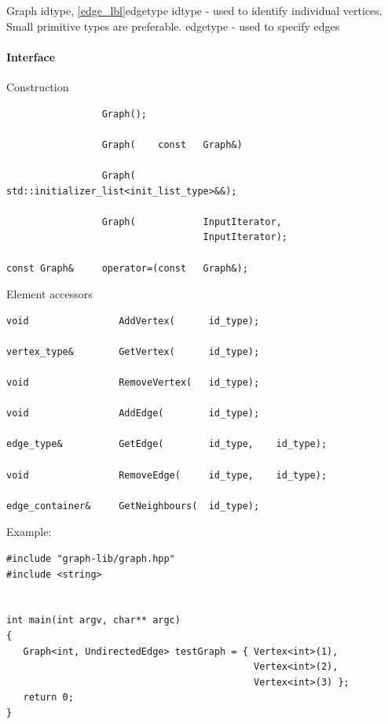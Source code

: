 \label{graph_lbl}

Graph idtype, \ref{edge_lbl}edgetype
idtype - used to identify individual vertices. Small primitive types are preferable. 
edgetype -  used to specify edges

\paragraph{Interface}


Construction

\begin{lstlisting}
                 Graph();

                 Graph(    const   Graph&)

                 Graph(            std::initializer_list<init_list_type>&&);

                 Graph(	           InputIterator,
                                   InputIterator);

const Graph&     operator=(const   Graph&);
\end{lstlisting}


Element accessors

\begin{lstlisting}
void                AddVertex(      id_type);

vertex_type&        GetVertex(      id_type);

void                RemoveVertex(   id_type);

void                AddEdge(        id_type);

edge_type&          GetEdge(        id_type,    id_type);

void                RemoveEdge(     id_type,    id_type);

edge_container&     GetNeighbours(  id_type);
\end{lstlisting}

Example:

\begin{lstlisting}
#include "graph-lib/graph.hpp"
#include <string>


int main(int argv, char** argc)
{
   Graph<int, UndirectedEdge> testGraph = { Vertex<int>(1),
                                            Vertex<int>(2),
                                            Vertex<int>(3) };
   return 0;
}

\end{lstlisting}